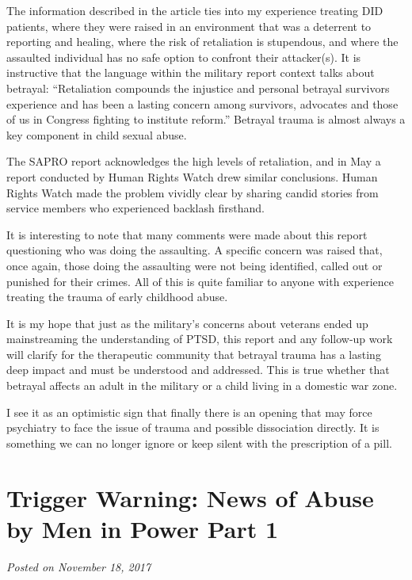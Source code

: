 \documentclass[]{book}
\begin{document}
The information described in the article ties into my experience treating DID patients, where they were raised in an environment that was a deterrent to reporting and healing, where the risk of retaliation is stupendous, and where the assaulted individual has no safe option to confront their attacker(s). It is instructive that the language within the military report context talks about betrayal: ``Retaliation compounds the injustice and personal betrayal survivors experience and has been a lasting concern among survivors, advocates and those of us in Congress fighting to institute reform.'' Betrayal trauma is almost always a key component in child sexual abuse.

The SAPRO report acknowledges the high levels of retaliation, and in May a report conducted by Human Rights Watch drew similar conclusions. Human Rights Watch made the problem vividly clear by sharing candid stories from service members who experienced backlash firsthand.

It is interesting to note that many comments were made about this report questioning who was doing the assaulting. A specific concern was raised that, once again, those doing the assaulting were not being identified, called out or punished for their crimes. All of this is quite familiar to anyone with experience treating the trauma of early childhood abuse.

It is my hope that just as the military's concerns about veterans ended up mainstreaming the understanding of PTSD, this report and any follow-up work will clarify for the therapeutic community that betrayal trauma has a lasting deep impact and must be understood and addressed. This is true whether that betrayal affects an adult in the military or a child living in a domestic war zone.

I see it as an optimistic sign that finally there is an opening that may force psychiatry to face the issue of trauma and possible dissociation directly. It is something we can no longer ignore or keep silent with the prescription of a pill.

\hypertarget{trigger-warning-news-of-abuse-by-men-in-power-part-1}{%
\section{Trigger Warning: News of Abuse by Men in Power Part 1}\label{trigger-warning-news-of-abuse-by-men-in-power-part-1}}

\emph{Posted on November 18, 2017}
\end{document}
